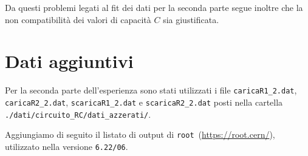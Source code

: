 \documentclass[
    reprint, 
    superscriptaddress, 
    altaffilletter, 
    amsmath, 
    amssymb, 
    a4paper
]{revtex4-2}
\newcommand{\cernroot}{\texttt{root}}
\begin{document}
    Da questi problemi legati al fit dei dati per la seconda parte segue inoltre che la non compatibilità dei valori di capacità $C$ sia giustificata.
    
    \appendix
    \setcounter{table}{0}
    \renewcommand{\thetable}{A-\Roman{table}}
    
    \section{Dati aggiuntivi}
    \label{section:appendix_EXT_DATA}
    
    Per la seconda parte dell'esperienza sono stati utilizzati i file \verb|caricaR1_2.dat|, \verb|caricaR2_2.dat|, \verb|scaricaR1_2.dat| e \verb|scaricaR2_2.dat| posti nella cartella \verb|./dati/circuito_RC/dati_azzerati/|.
    
    Aggiungiamo di seguito il listato di output di \cernroot~(\url{https://root.cern/}), utilizzato nella versione \verb|6.22/06|.
    
    
\end{document}
